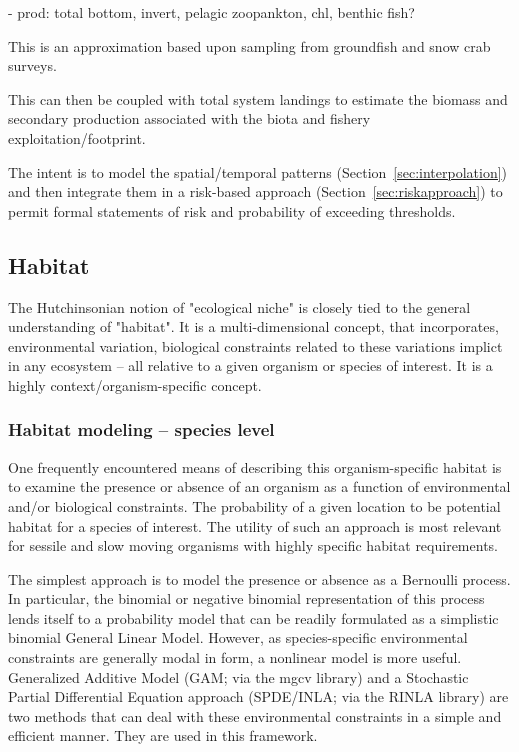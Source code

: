 \documentclass[letterpaper,portrait,11pt]{scrartcl}
\numberwithin{equation}{section}		%
\numberwithin{figure}{section}		%
\numberwithin{table}{section}				%
\begin{document}
- prod: total bottom, invert, pelagic zoopankton, chl, benthic fish?


This is an approximation based upon sampling from groundfish and snow crab surveys. 

This can then be coupled with total system landings to estimate the biomass and secondary production associated with the biota and fishery exploitation/footprint. 

The intent is to model the spatial/temporal patterns (Section~\ref{sec:interpolation}) and then integrate them in a risk-based approach (Section~\ref{sec:riskapproach}) to permit formal statements of risk and probability of exceeding thresholds. 

\clearpage
\subsection{Habitat}

The Hutchinsonian notion of "ecological niche" is closely tied to the general understanding of "habitat". It is a multi-dimensional concept, that incorporates, environmental variation, biological constraints related to these variations implict in any ecosystem -- all relative to a given organism or species of interest. It is a highly context/organism-specific concept. 


\subsubsection{Habitat modeling -- species level}
\label{sec:habitatSpecies}
One frequently encountered means of describing this organism-specific habitat is to examine the presence or absence of an organism as a function of environmental and/or biological constraints. The probability of a given location to be potential habitat for a species of interest. The utility of such an approach is most relevant for sessile and slow moving organisms with highly specific habitat requirements. 

The simplest approach is to model the presence or absence as a Bernoulli process. In particular, the binomial or negative binomial representation of this process lends itself to a probability model that can be readily formulated as a simplistic binomial General Linear Model. However, as species-specific environmental constraints are generally modal in form, a nonlinear model is more useful. Generalized Additive Model (GAM; via the mgcv library) and a Stochastic Partial Differential Equation approach (SPDE/INLA; via the RINLA library) are two methods that can deal with these environmental constraints in a simple and efficient manner. They are used in this framework.
\end{document}
